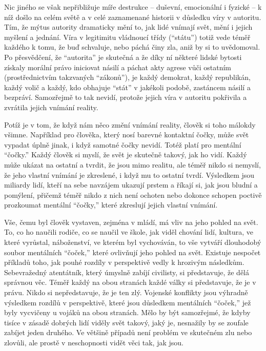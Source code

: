 \documentclass{book}
\begin{document}
Nic jiného se však nepřibližuje míře destrukce -- duševní, emocionální i fyzické -- k níž došlo na celém světě a v celé zaznamenané historii v důsledku víry v autoritu. Tím, že mýtus autority dramaticky mění to, jak lidé vnímají svět, mění i jejich myšlení a jednání. Víra v legitimitu vládnoucí třídy (\enquote{státu}) totiž vede téměř každého k tomu, že buď schvaluje, nebo páchá činy zla, aniž by si to uvědomoval. Po přesvědčení, že \enquote{autorita} je skutečná a že díky ní některé lidské bytosti získaly morální právo iniciovat násilí a páchat akty agrese vůči ostatním (prostřednictvím takzvaných \enquote{zákonů}), je každý demokrat, každý republikán, každý volič a každý, kdo obhajuje \enquote{stát} v jakékoli podobě, zastáncem násilí a bezpráví. Samozřejmě to tak nevidí, protože jejich víra v autoritu pokřivila a zvrátila jejich vnímání reality.

Potíž je v tom, že když nám něco změní vnímání reality, člověk si toho málokdy všimne. Například pro člověka, který nosí barevné kontaktní čočky, může svět vypadat úplně jinak, i když samotné čočky nevidí. Totéž platí pro mentální \enquote{čočky.} Každý člověk si myslí, že svět je skutečně takový, jak ho vidí. Každý může ukázat na ostatní a tvrdit, že jsou mimo realitu, ale téměř nikdo si nemyslí, že jeho vlastní vnímání je zkreslené, i když mu to ostatní tvrdí. Výsledkem jsou miliardy lidí, kteří na sebe navzájem ukazují prstem a říkají si, jak jsou bludní a pomýlení, přičemž téměř nikdo z nich není ochoten nebo dokonce schopen poctivě prozkoumat mentální \enquote{čočky,} které zkreslují jejich vlastní vnímání.

Vše, čemu byl člověk vystaven, zejména v mládí, má vliv na jeho pohled na svět. To, co ho naučili rodiče, co se naučil ve škole, jak viděl chování lidí, kultura, ve které vyrůstal, náboženství, ve kterém byl vychováván, to vše vytváří dlouhodobý soubor mentálních \enquote{čoček,} které ovlivňují jeho pohled na svět. Existuje nespočet příkladů toho, jak pouhé rozdíly v perspektivě vedly k hrozivým následkům. Sebevražedný atentátník, který úmyslně zabíjí civilisty, si představuje, že dělá správnou věc. Téměř každý na obou stranách každé války si představuje, že je v právu. Nikdo si nepředstavuje, že je ten zlý. Vojenské konflikty jsou výhradně výsledkem rozdílů v perspektivě, které jsou důsledkem mentálních \enquote{čoček,} jež byly vycvičeny u vojáků na obou stranách. Mělo by být samozřejmé, že kdyby tisíce v zásadě dobrých lidí viděly svět takový, jaký je, nesnažily by se zoufale zabíjet jeden druhého. Ve většině případů není problém ve skutečném zlu nebo zlovůli, ale prostě v neschopnosti vidět věci tak, jak jsou.
\end{document}
